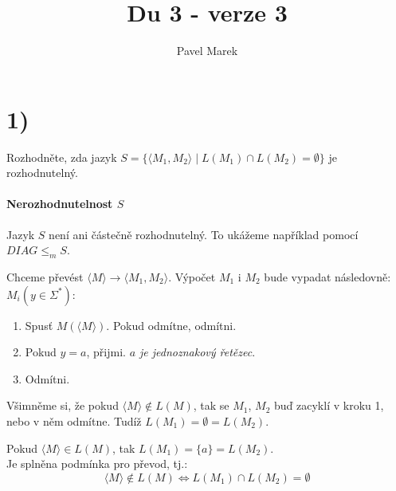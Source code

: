 \documentclass{article}
\begin{document}
\title{Du 3 - verze 3}
\author{Pavel Marek}
\date{}

\maketitle

\section*{1)}
Rozhodněte, zda jazyk $S = \{\langle M_1, M_2 \rangle \mid
L(M_1) \cap L(M_2) = \emptyset\}$ je rozhodnutelný.

\paragraph{Nerozhodnutelnost $S$}
Jazyk $S$ není ani částečně rozhodnutelný. To ukážeme například pomocí
$DIAG \leq_m S$.

Chceme převést $\langle M \rangle \rightarrow \langle M_1, M_2 \rangle$.
Výpočet $M_1$ i $M_2$ bude vypadat následovně: \\
$M_i(y \in \Sigma^*)$:
\begin{enumerate}
  \item Spusť $M(\langle M \rangle)$. Pokud odmítne, odmítni.
  \item Pokud $y = a$, přijmi. \emph{$a$ je jednoznakový řetězec}.
  \item Odmítni.
\end{enumerate}

Všimněme si, že pokud $\langle M \rangle \notin L(M)$, tak se $M_1$, $M_2$
buď zacyklí v kroku 1, nebo v něm odmítne. Tudíž $L(M_1) = \emptyset = L(M_2)$.

Pokud $\langle M \rangle \in L(M)$, tak $L(M_1) = \{a\} = L(M_2)$.\\

Je splněna podmínka pro převod, tj.:
$$\langle M \rangle \notin L(M) \Leftrightarrow L(M_1) \cap L(M_2) = \emptyset$$
\end{document}
